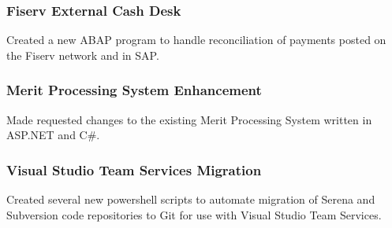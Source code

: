 \documentclass{article}
\begin{document}
		\subsubsection{Fiserv External Cash Desk}
			\begin{addmargin}[1em]{0em}
				Created a new ABAP program to handle reconciliation of payments posted on the Fiserv network and in SAP.
			\end{addmargin}

		\subsubsection{Merit Processing System Enhancement}
			\begin{addmargin}[1em]{0em}
				Made requested changes to the existing Merit Processing System written in ASP.NET and C\#.
			\end{addmargin}

		\subsubsection{Visual Studio Team Services Migration}
			\begin{addmargin}[1em]{0em}
				Created several new powershell scripts to automate migration of Serena and Subversion code repositories to Git for use with Visual Studio Team Services.
			\end{addmargin}

\end{document}
